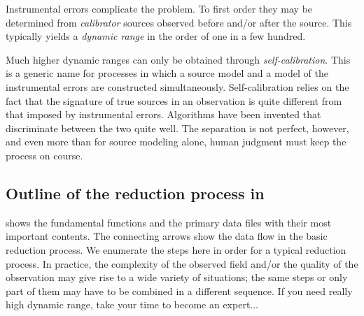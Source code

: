 	Instrumental errors complicate the problem. To first order they may be
determined from {\em calibrator} sources observed before and/or after the
source. This typically yields a {\em dynamic range} in the order of one in a
few hundred.

	Much higher dynamic ranges can only be obtained through {\em
self-calibration}. This is a generic name for processes in which a source model
and a model of the instrumental errors are constructed simultaneously.
Self-calibration relies on the fact that the signature of true sources in an
observation is quite different from that imposed by instrumental errors.
Algorithms have been invented that discriminate between the two quite well. The
separation is not perfect, however, and even more than for source modeling
alone, human judgment must keep the process on course.


\subsection{ Outline of the reduction process in \NEWSTAR }
\label{.outline}

	 shows the fundamental functions and the
primary data files with their most important contents. The connecting arrows
show the data flow in the basic reduction process. We enumerate the steps here
in order for a typical reduction process. In practice, the complexity of the
observed field and/or the quality of the observation may give rise to a wide
variety of situations; the same steps or only part of them may have to be
combined in a different sequence. If you need really high dynamic range, take
your time to become an expert...

